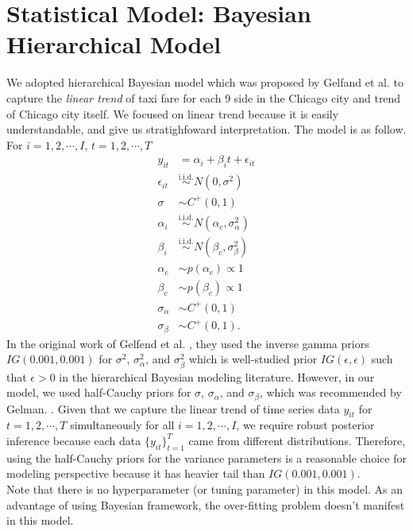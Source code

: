 \documentclass[11pt,a4paper]{article}
\begin{document}
\section{Statistical Model: Bayesian Hierarchical Model}
We adopted hierarchical Bayesian model which was proposed by Gelfand et al. \cite{gelfand1990} to capture the \emph{linear trend} of taxi fare for each 9 side in the Chicago city and trend of Chicago city itself. We focused on linear trend because it is easily understandable, and give us stratighfoward interpretation. The model is as follow.\\
For $i = 1,2, \cdots, I$, $t = 1,2, \cdots, T$
\begin{align}
y_{it} & = \alpha_{i} + \beta_{i} t + \epsilon_{it}\\
\epsilon_{it}& \overset{\text{i.i.d.}}{\sim} N(0,\sigma^{2})\\
\sigma & \sim C^{+}(0,1)\\
\alpha_{i} & \overset{\text{i.i.d.}}{\sim} N(\alpha_{c}, \sigma_{\alpha}^{2})\\
\beta_{i} & \overset{\text{i.i.d.}}{\sim} N(\beta_{c}, \sigma_{\beta}^{2})\\
\alpha_{c} & \sim p(\alpha_{c}) \propto 1 \\
\beta_{c} & \sim p(\beta_{c}) \propto 1 \\
\sigma_{\alpha} &\sim C^{+}(0,1)\\
\sigma_{\beta} &\sim C^{+}(0,1).
\end{align}
In the original work of Gelfend et al. \cite{gelfand1990}, they used the inverse gamma priors $IG(0.001, 0.001)$ for $\sigma^{2}$, $\sigma_{\alpha}^{2}$, and $\sigma_{\beta}^{2}$ which is well-studied prior $IG(\epsilon, \epsilon)$ such that $\epsilon >  0$ in the hierarchical Bayesian modeling literature. However, in our model, we used half-Cauchy priors for $\sigma$, $\sigma_{\alpha}$, and $\sigma_{\beta}$, which was recommended by Gelman. \cite{gelman2006}. Given that we capture the linear trend of time series data $y_{it}$ for $t = 1,2, \cdots, T$ simultaneously for all $i = 1, 2, \cdots, I $, we require robust posterior inference because each data $\{ y_{it} \}_{t=1}^{T}$ came from different distributions. Therefore, using the half-Cauchy priors for the variance parameters is a reasonable choice for modeling perspective because it has heavier tail than $IG(0.001, 0.001)$. \\
Note that there is no hyperparameter (or tuning parameter) in this model. As an advantage of using Bayesian framework, the over-fitting problem doesn't manifest in this model.\\
\end{document}
